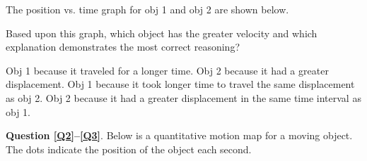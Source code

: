 \documentclass[]{exam}
\begin{document}
\begin{questions}

\question 
The position vs. time graph for obj 1 and obj 2 are shown below.

\begin{center}
\end{center}

Based upon this graph, which object has the greater velocity and which explanation demonstrates the most correct reasoning?

\begin{randomizechoices}[norandomize]
    \choice Obj 1 because it traveled for a longer time.
    \choice Obj 2 because it had a greater displacement.
    \choice Obj 1 because it took longer time to travel the same displacement as obj 2.
    \correctchoice Obj 2 because it had a greater displacement in the same time interval as obj 1.
\end{randomizechoices}

\begin{EnvUplevel}
    \textbf{Question \ref{Q2}--\ref{Q3}}. Below is a quantitative motion map for a moving object. The dots indicate the position of the object each second.
\end{EnvUplevel}

\begin{center}
\end{center}


\end{questions}
\end{document}
